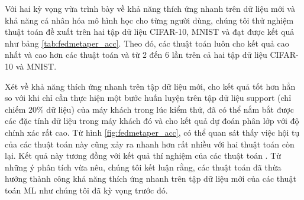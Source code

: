 Với hai kỳ vọng vừa trình bày về khả năng thích ứng nhanh trên dữ liệu mới và khả năng cá nhân hóa mô hình học cho từng người dùng, chúng tôi thử nghiệm thuật toán đề xuất trên hai tập dữ liệu CIFAR-10, MNIST và đạt được kết quả như bảng \ref{tab:fedmetaper_acc}. Theo đó, các thuật toán  luôn cho kết quả cao nhất và cao hơn các thuật toán  và  từ 2 đến 6 lần trên cả hai tập dữ liệu CIFAR-10 và MNIST.

\begin{table}[H]
    \centering
    \caption{Bảng độ chính xác (\%) của thuật toán FedPer và các thuật toán FedMeta-Per tính trên điểm dữ liệu (dữ liệu Non-IID)}
    \label{tab:fedmetaper_acc}
\end{table}

Xét về khả năng thích ứng nhanh trên tập dữ liệu mới,  cho kết quả tốt hơn hẳn so với  khi chỉ cần thực hiện một bước huấn luyện trên tập dữ liệu support (chỉ chiếm 20\% dữ liệu) của máy khách trong lúc kiểm thử, đã có thể nắm bắt được các đặc tính dữ liệu trong máy khách đó và cho kết quả dự đoán phân lớp với độ chính xác rất cao. Từ hình \ref{fig:fedmetaper_acc}, có thể quan sát thấy việc hội tụ của các thuật toán này cũng xảy ra nhanh hơn rất nhiều với hai thuật toán còn lại. Kết quả này tương đồng với kết quả thí nghiệm của các thuật toán . Từ những ý phân tích vừa nêu, chúng tôi kết luận rằng, các thuật toán  đã thừa hưởng thành công khả năng thích ứng nhanh trên tập dữ liệu mới của các thuật toán ML như chúng tôi đã kỳ vọng trước đó.

